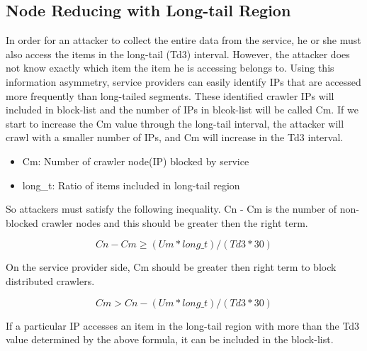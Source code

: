 \documentclass[sigconf,anonymous=true]{acmart}
\begin{document}
\subsection{Node Reducing with Long-tail Region}
In order for an attacker to collect the entire data from the service, he or she must also access the items in the long-tail (Td3) interval. However, the attacker does not know exactly which item the item he is accessing belongs to. Using this information asymmetry, service providers can easily identify IPs that are accessed more frequently than long-tailed segments. These identified crawler IPs will included in block-list and the number of IPs in blcok-list will be called Cm. If we start to increase the Cm value through the long-tail interval, the attacker will crawl with a smaller number of IPs, and Cm will increase in the Td3 interval.

\begin{itemize}
\item Cm: Number of crawler node(IP) blocked by service
\item long\_t: Ratio of items included in long-tail region
\end{itemize}

So attackers must satisfy the following inequality. Cn - Cm is the number of non-blocked crawler nodes and this should be greater then the right term.

  \begin{displaymath}
Cn - Cm \geq (Um * long\_t) / (Td3 * 30)
  \end{displaymath}\newline

On the service provider side, Cm should be greater then right term to block distributed crawlers.

  \begin{displaymath}
Cm > Cn - (Um * long\_t) / (Td3 * 30)
  \end{displaymath}\newline

If a particular IP accesses an item in the long-tail region with more than the Td3 value determined by the above formula, it can be included in the block-list.
\end{document}

